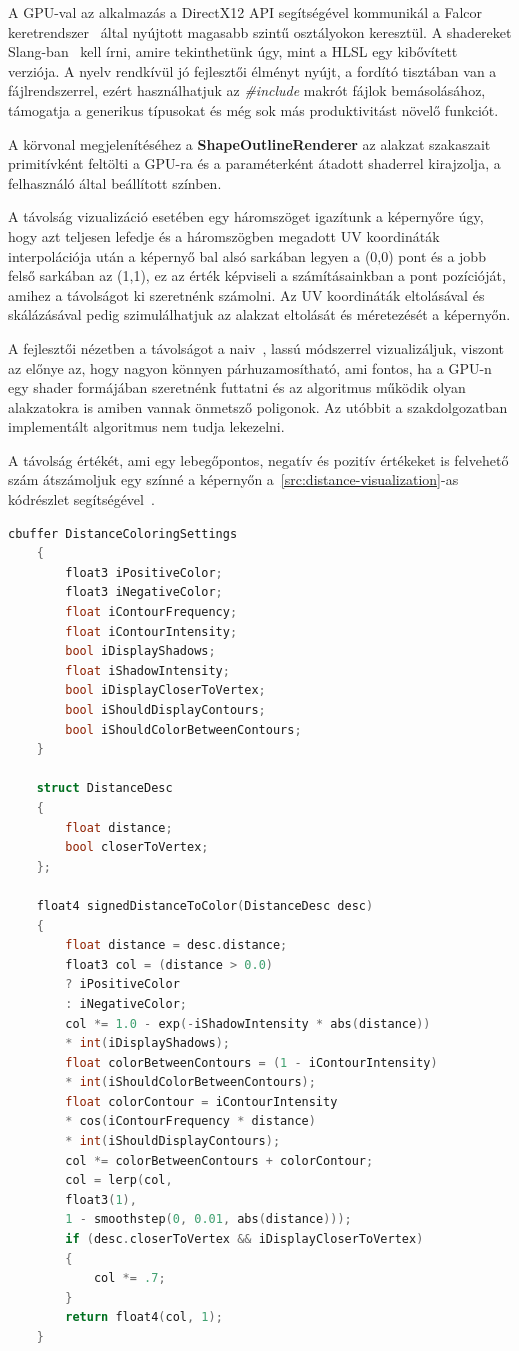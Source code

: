 A GPU-val az alkalmazás a DirectX12 API segítségével kommunikál a Falcor keretrendszer~\cite{falcor} által nyújtott magasabb szintű osztályokon keresztül. A shadereket Slang-ban~\cite{slang} kell írni, amire tekinthetünk úgy, mint a HLSL egy kibővített verziója. A nyelv rendkívül jó fejlesztői élményt nyújt, a fordító tisztában van a fájlrendszerrel, ezért használhatjuk az \textit{\#include} makrót fájlok bemásolásához, támogatja a generikus típusokat és még sok más produktivitást növelő funkciót.

A körvonal megjelenítéséhez a \textbf{ShapeOutlineRenderer} az alakzat szakaszait primitívként feltölti a GPU-ra és a paraméterként átadott shaderrel kirajzolja, a felhasználó által beállított színben.

A távolság vizualizáció esetében egy háromszöget igazítunk a képernyőre úgy, hogy azt teljesen lefedje és a háromszögben megadott UV koordináták interpolációja után a képernyő bal alsó sarkában legyen a (0,0) pont és a jobb felső sarkában az (1,1), ez az érték képviseli a számításainkban a pont pozícióját, amihez a távolságot ki szeretnénk számolni. Az UV koordináták eltolásával és skálázásával pedig szimulálhatjuk az alakzat eltolását és méretezését a képernyőn.

A fejlesztői nézetben a távolságot a naiv~\cite{inigoquilez2d}, lassú módszerrel vizualizáljuk, viszont az előnye az, hogy nagyon könnyen párhuzamosítható, ami fontos, ha a GPU-n egy shader formájában szeretnénk futtatni és az algoritmus működik olyan alakzatokra is amiben vannak önmetsző poligonok. Az utóbbit a szakdolgozatban implementált algoritmus nem tudja lekezelni.

A távolság értékét, ami egy lebegőpontos, negatív és pozitív értékeket is felvehető szám átszámoljuk egy színné a képernyőn a~\ref{src:distance-visualization}-as kódrészlet segítségével~\cite{inigoquilezshader}.

\begin{lstlisting}[language=c]
	cbuffer DistanceColoringSettings
	{
		float3 iPositiveColor;
		float3 iNegativeColor;
		float iContourFrequency;
		float iContourIntensity;
		bool iDisplayShadows;
		float iShadowIntensity;
		bool iDisplayCloserToVertex;
		bool iShouldDisplayContours;
		bool iShouldColorBetweenContours;
	}

	struct DistanceDesc
	{
		float distance;
		bool closerToVertex;
	};

	float4 signedDistanceToColor(DistanceDesc desc)
	{
		float distance = desc.distance;
		float3 col = (distance > 0.0)
		? iPositiveColor
		: iNegativeColor;
		col *= 1.0 - exp(-iShadowIntensity * abs(distance))
		* int(iDisplayShadows);
		float colorBetweenContours = (1 - iContourIntensity)
		* int(iShouldColorBetweenContours);
		float colorContour = iContourIntensity
		* cos(iContourFrequency * distance)
		* int(iShouldDisplayContours);
		col *= colorBetweenContours + colorContour;
		col = lerp(col,
		float3(1),
		1 - smoothstep(0, 0.01, abs(distance)));
		if (desc.closerToVertex && iDisplayCloserToVertex)
		{
			col *= .7;
		}
		return float4(col, 1);
	}

\end{lstlisting}

